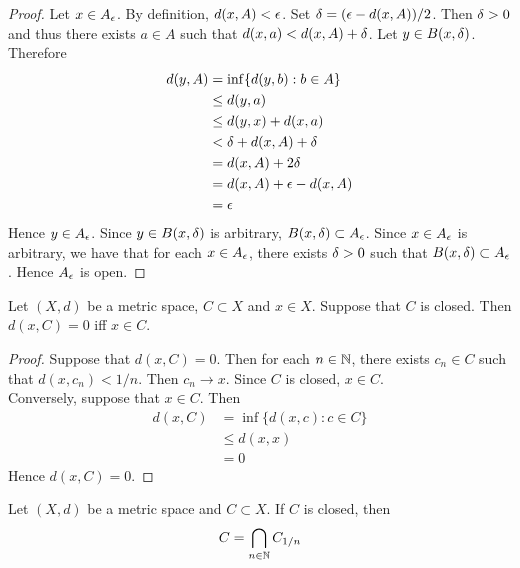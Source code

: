 \documentclass{book}
\begin{document}
\begin{proof}
	Let $x \in A_{\epsilon}$. By definition, $d(x, A) < \epsilon$. Set $\delta = (\epsilon - d(x,A)) / 2$. Then $\delta > 0$ and thus there exists $a \in A$ such that $d(x,a) < d(x, A) + \delta$. Let $y \in B(x, \delta)$. Therefore
	\begin{align*}
		d(y, A)
		& = \inf \{d(y, b): b \in A\} \\
		& \leq d(y, a) \\
		& \leq d(y, x) + d(x, a) \\
		& < \delta + d(x, A) + \delta \\
		& = d(x, A) + 2\delta \\
		& = d(x, A) + \epsilon - d(x, A) \\
		& = \epsilon 
	\end{align*}
	Hence $y \in A_{\epsilon}$. Since $y \in B(x, \delta)$ is arbitrary, $B(x, \delta) \subset A_{\epsilon}$. Since $x \in A_{\epsilon}$ is arbitrary, we have that for each $x \in A_{\epsilon}$, there exists $\delta > 0$ such that $B(x, \delta) \subset A_{\epsilon}$. Hence $A_{\epsilon}$ is open.
\end{proof}

\begin{ex}
		Let $(X, d)$ be a metric space, $C \subset X$ and $x \in X$. Suppose that $C$ is closed. Then $d(x, C) = 0$ iff $x \in C$.
\end{ex}

\begin{proof}
	Suppose that $d(x, C) = 0$. Then for each $n \in \mathbb{N}$, there exists $c_n \in C$ such that $d(x, c_n) < 1/n$. Then $c_n \rightarrow x$. Since $C$ is closed, $x \in C$. \\
	Conversely, suppose that $x \in C$. Then 
	\begin{align*}
		d(x, C)
		& = \inf \{d(x, c): c \in C\} \\
		& \leq d(x, x) \\
		& = 0
	\end{align*}
	Hence $d(x, C) = 0$.
\end{proof}

\begin{ex}
	Let $(X, d)$ be a metric space and $C \subset X$. If $C$ is closed, then
	$$C = \bigcap_{n \in \mathbb{N}} C_{1/n}$$
\end{ex}
\end{document}
